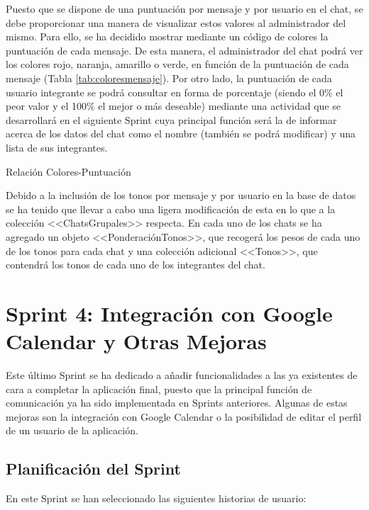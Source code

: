 Puesto que se dispone de una puntuación por mensaje y por usuario en el chat, se debe proporcionar una manera de visualizar estos valores al administrador del mismo. Para ello, se ha decidido mostrar mediante un código de colores la puntuación de cada mensaje. De esta manera, el administrador del chat podrá ver los colores rojo, naranja, amarillo o verde, en función de la puntuación de cada mensaje (Tabla \ref{tab:coloresmensaje}). Por otro lado, la puntuación de cada usuario integrante se podrá consultar en forma de porcentaje (siendo el 0\% el peor valor y el 100\% el mejor o más deseable) mediante una actividad que se desarrollará en el siguiente Sprint cuya principal función será la de informar acerca de los datos del chat como el nombre (también se podrá modificar) y una lista de sus integrantes.

\begin{table}[!htbp]
	\centering
	{\small
		
	}
	\caption[Relación de Colores-Puntuación]
	{Relación Colores-Puntuación}
	\label{tab:coloresmensaje}
\end{table}

Debido a la inclusión de los tonos por mensaje y por usuario en la base de datos se ha tenido que llevar a cabo una ligera modificación de esta en lo que a la colección \mbox{<<ChatsGrupales>>} respecta. En cada uno de los chats se ha agregado un objeto <<PonderaciónTonos>>, que recogerá los pesos de cada uno de los tonos para cada chat y una colección adicional <<Tonos>>, que contendrá los tonos de cada uno de los integrantes del chat.

\clearpage


\section{Sprint 4: Integración con Google Calendar y Otras Mejoras}
Este último Sprint se ha dedicado a añadir funcionalidades a las ya existentes de cara a completar la aplicación final, puesto que la principal función de comunicación ya ha sido implementada en Sprints anteriores. Algunas de estas mejoras son la integración con Google Calendar o la posibilidad de editar el perfil de un usuario de la aplicación.

\subsection{Planificación del Sprint}
En este Sprint se han seleccionado las siguientes historias de usuario:


